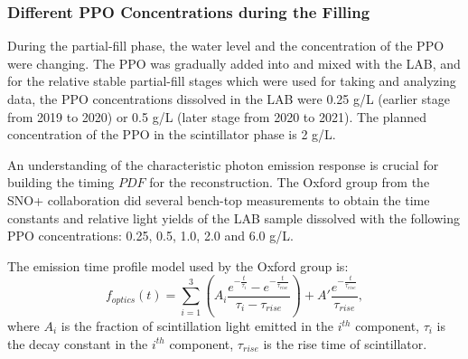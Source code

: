 \subsubsection{Different PPO Concentrations during the Filling}
During the partial-fill phase, the water level and the concentration of the PPO were changing. The PPO was gradually added into and mixed with the LAB, and for the relative stable partial-fill stages which were used for taking and analyzing data, the PPO concentrations dissolved in the LAB were 0.25 g/L (earlier stage from 2019 to 2020) or 0.5 g/L (later stage from 2020 to 2021). The planned concentration of the PPO in the scintillator phase is 2 g/L.

An understanding of the characteristic photon emission response is crucial for building the timing $PDF$ for the reconstruction. The Oxford group from the SNO+ collaboration did several bench-top measurements to obtain the time constants and relative light yields of the LAB sample dissolved with the following PPO concentrations: 0.25, 0.5, 1.0, 2.0 and 6.0 g/L\cite{oxfordMeasurement0,oxfordMeasurement}.

The emission time profile model used by the Oxford group is\cite{oxfordMeasurement}: 
\begin{equation}
f_{optics}(t)=\sum_{i=1}^3 (A_i\frac{e^{-\frac{t}{\tau_i}}-e^{-\frac{t}{\tau_{rise}}}}{\tau_i-\tau_{rise}})+A'\frac{e^{-\frac{t}{\tau_{rise}}}}{\tau_{rise}},
\end{equation}
where $A_i$ is the fraction of scintillation light emitted in the $i^{th}$ component, $\tau_i$ is the decay constant in the $i^{th}$ component, $\tau_{rise}$ is the rise time of scintillator.

